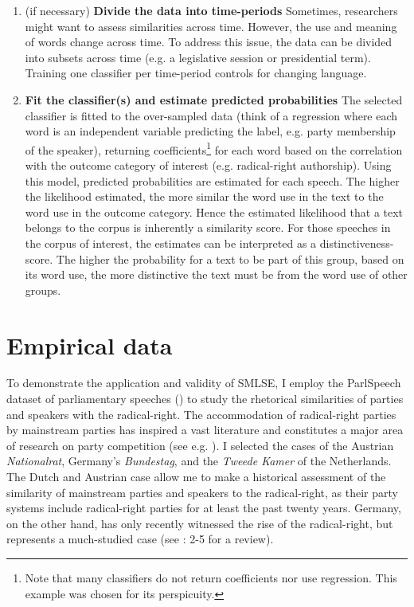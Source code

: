 \documentclass{article}
\begin{document}
\begin{enumerate}
    \item (if necessary) \textbf{Divide the data into time-periods} \newline Sometimes, researchers might want to assess similarities across time. However, the use and meaning of words change across time. To address this issue, the data can be divided into subsets across time (e.g. a legislative session or presidential term). Training one classifier per time-period controls for changing language.\par
    \item \textbf{Fit the classifier(s) and estimate predicted probabilities} \newline The selected classifier is fitted to the over-sampled data (think of a regression where each word is an independent variable predicting the label, e.g. party membership of the speaker), returning coefficients\footnote{Note that many classifiers do not return coefficients nor use regression. This example was chosen for its perspicuity.} for each word based on the correlation with the outcome category of interest (e.g. radical-right authorship). Using this model, predicted probabilities are estimated for each speech. The higher the likelihood estimated, the more similar the word use in the text to the word use in the outcome category. Hence the estimated likelihood that a text belongs to the corpus is inherently a similarity score. For those speeches in the corpus of interest, the estimates can be interpreted as a distinctiveness-score. The higher the probability for a text to be part of this group, based on its word use, the more distinctive the text must be from the word use of other groups.\par 
\end{enumerate}



\section{Empirical data}
To demonstrate the application and validity of SMLSE, I employ the ParlSpeech dataset of parliamentary speeches (\cite{Rauh2020}) to study the rhetorical similarities of parties and speakers with the radical-right. The accommodation of radical-right parties by mainstream parties has inspired a vast literature and constitutes a major area of research on party competition (see e.g. \cite{Arzheimer2009, Bale2010e, Dahlstrom2012a, Harmel1997a, Krause2019accomodation, Meguid2005b, Schumacher2014a, Spoon2020a, VanDerBrug2005b, VanSpanje2010, Wagner2017}). I selected the cases of the Austrian \textit{Nationalrat}, Germany's \textit{Bundestag}, and the \textit{Tweede Kamer} of the Netherlands. The Dutch and Austrian case allow me to make a historical assessment of the similarity of mainstream parties and speakers to the radical-right, as their party systems include radical-right parties for at least the past twenty years. Germany, on the other hand, has only recently witnessed the rise of the radical-right, but represents a much-studied case (see \cite{Arzheimer2019}: 2-5 for a review).\par
\end{document}
